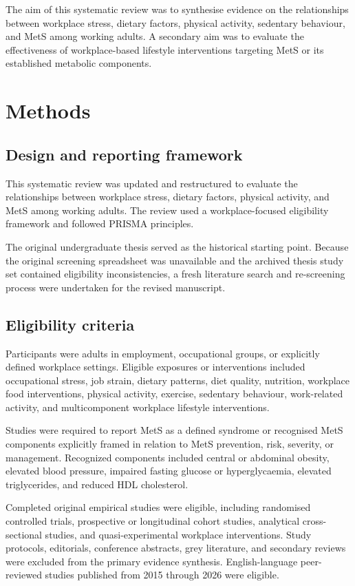 \documentclass[11pt]{article}
\begin{document}
The aim of this systematic review was to synthesise evidence on the relationships between workplace stress, dietary factors, physical activity, sedentary behaviour, and MetS among working adults. A secondary aim was to evaluate the effectiveness of workplace-based lifestyle interventions targeting MetS or its established metabolic components.

\section{Methods}

\subsection{Design and reporting framework}

This systematic review was updated and restructured to evaluate the relationships between workplace stress, dietary factors, physical activity, and MetS among working adults. The review used a workplace-focused eligibility framework and followed PRISMA principles.

The original undergraduate thesis served as the historical starting point. Because the original screening spreadsheet was unavailable and the archived thesis study set contained eligibility inconsistencies, a fresh literature search and re-screening process were undertaken for the revised manuscript.

\subsection{Eligibility criteria}

Participants were adults in employment, occupational groups, or explicitly defined workplace settings. Eligible exposures or interventions included occupational stress, job strain, dietary patterns, diet quality, nutrition, workplace food interventions, physical activity, exercise, sedentary behaviour, work-related activity, and multicomponent workplace lifestyle interventions.

Studies were required to report MetS as a defined syndrome or recognised MetS components explicitly framed in relation to MetS prevention, risk, severity, or management. Recognized components included central or abdominal obesity, elevated blood pressure, impaired fasting glucose or hyperglycaemia, elevated triglycerides, and reduced HDL cholesterol.

Completed original empirical studies were eligible, including randomised controlled trials, prospective or longitudinal cohort studies, analytical cross-sectional studies, and quasi-experimental workplace interventions. Study protocols, editorials, conference abstracts, grey literature, and secondary reviews were excluded from the primary evidence synthesis. English-language peer-reviewed studies published from 2015 through 2026 were eligible.
\end{document}

